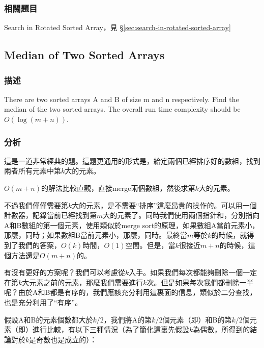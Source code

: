 \subsubsection{相關題目}

\begindot
\item Search in Rotated Sorted Array，見 \S \ref{sec:search-in-rotated-sorted-array}
\myenddot


\subsection{Median of Two Sorted Arrays}
\label{sec:median-of-two-sorted-arrays}


\subsubsection{描述}
There are two sorted arrays A and B of size m and n respectively. Find the median of the two sorted arrays. The overall run time complexity should be $O(\log (m+n))$.


\subsubsection{分析}
這是一道非常經典的題。這題更通用的形式是，給定兩個已經排序好的數組，找到兩者所有元素中第$k$大的元素。

$O(m+n)$的解法比較直觀，直接merge兩個數組，然後求第$k$大的元素。

不過我們僅僅需要第$k$大的元素，是不需要“排序”這麼昂貴的操作的。可以用一個計數器，記錄當前已經找到第$m$大的元素了。同時我們使用兩個指針和，分別指向A和B數組的第一個元素，使用類似於merge sort的原理，如果數組A當前元素小，那麼，同時；如果數組B當前元素小，那麼，同時。最終當$m$等於$k$的時候，就得到了我們的答案，$O(k)$時間，$O(1)$空間。但是，當$k$很接近$m+n$的時候，這個方法還是$O(m+n)$的。

有沒有更好的方案呢？我們可以考慮從$k$入手。如果我們每次都能夠刪除一個一定在第$k$大元素之前的元素，那麼我們需要進行$k$次。但是如果每次我們都刪除一半呢？由於A和B都是有序的，我們應該充分利用這裏面的信息，類似於二分查找，也是充分利用了“有序”。

假設A和B的元素個數都大於$k/2$，我們將A的第$k/2$個元素（即）和B的第$k/2$個元素（即）進行比較，有以下三種情況（為了簡化這裏先假設$k$為偶數，所得到的結論對於$k$是奇數也是成立的）：
\begindot
\item {}
\item {}
\item {}
\myenddot


